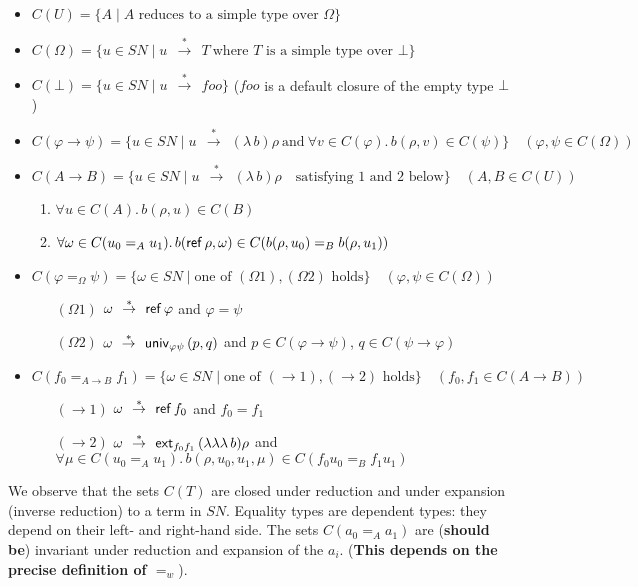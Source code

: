 \documentclass[10pt,a4paper]{article}
\newcommand{\set}[1]{\{#1\}}
\newcommand{\unphsi}{{\univ_{\varphi\psi}}}
\newcommand{\extfs}{{\ext_{f_0 f_1}}}
\newcommand{\rtr}{~~{\stackrel{*}{\to}}~~}
\newcommand{\foo}{\mathit{foo}}
\newcommand{\SN}{\mathit{SN}}
\newcommand{\Ref}{{\sf ref}}
\newcommand{\ext}{{\sf ext}}
\newcommand{\univ}{{\sf univ}}
\begin{document}
\begin{itemize}
\item $C(U) = \set{A \mid \text{$A$ reduces to a simple type over $\Omega$}}$
\item $C(\Omega) = \set{u\in SN \mid u \rtr T
~\text{where $T$ is a simple type over $\bot$}}$
\item $C(\bot) = \set{u\in SN \mid u \rtr \foo}$ 
($\foo$ is a default closure of the empty type $\bot$)
\item $C(\varphi\to\psi) = \set{u\in SN \mid u \rtr (\lambda\,b)\rho 
~\text{and}~ \forall v\in C(\varphi).\,b(\rho,v) \in C(\psi)}\quad(\varphi,\psi \in C(\Omega))$
\item $C(A{\to}B) = \set{u\in SN \mid u \rtr (\lambda\,b)\rho \quad
\text{satisfying 1 and 2 below}}\quad(A,B \in C(U))$
  \begin{enumerate}
  \item $\forall u\in C(A).\,b(\rho,u) \in C(B)$
  \item $\forall \omega\in C(u_0 =_A u_1).\,b(\Ref\,\rho,\omega) 
        \in C(b(\rho,u_0) =_B b(\rho,u_1))$
  \end{enumerate}
\item $C(\varphi =_\Omega \psi) = \set{\omega\in SN \mid 
\text{one of $(\Omega1),(\Omega2)$ holds}}\quad(\varphi,\psi \in C(\Omega))$ 
  \begin{enumerate}
  \item[$(\Omega1)$] $\omega \rtr \Ref\,\varphi$ and $\varphi =  \psi$
  \item[$(\Omega2)$] $\omega \rtr \unphsi\,(p,q)$ and $p\in C(\varphi\to\psi)$, $q\in C(\psi\to\varphi)$
  \end{enumerate}
\item $C(f_0 =_{A{\to}B} f_1) = \set{\omega\in SN \mid 
\text{one of $({\to}1),({\to}2)$ holds}}\quad(f_0,f_1 \in C(A{\to}B))$
  \begin{enumerate}
  \item[$({\to}1)$] $\omega \rtr \Ref\,f_0$ and $f_0 = f_1$
  \item[$({\to}2)$] $\omega \rtr \extfs\,(\lambda\lambda\lambda\,b)\rho$ and
      $\forall\mu\in C(u_0 =_A u_1).\,b(\rho,u_0,u_1,\mu) \in C(f_0 u_0 =_B f_1 u_1)$
  \end{enumerate}
\end{itemize}

We observe that the sets $C(T)$ are closed under reduction and
under expansion (inverse reduction) to a term in $\SN$.
Equality types are dependent types: they depend on their left- and right-hand side.
The sets $C(a_0 =_A a_1)$ are ({\bf should be}) invariant under reduction and expansion
of the $a_i$. ({\bf This depends on the precise definition of $=_w$}).
\end{document}
